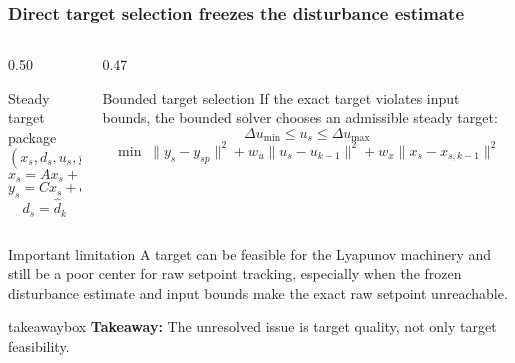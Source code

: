 \documentclass[aspectratio=169]{beamer}
\newcommand{\takeawaybox}[1]{%
\vspace{0.03cm}
\begin{center}
\begin{beamercolorbox}[wd=0.94\textwidth,sep=3pt,center,rounded=true,shadow=false]{takeawaybox}
\scriptsize
\textbf{\textcolor{maroon1}{Takeaway:}} #1
\end{beamercolorbox}
\end{center}
}
\begin{document}
\begin{frame}
\frametitle{\large \textbf{Direct target selection freezes the disturbance estimate}}
\scriptsize

\begin{columns}[T,onlytextwidth]
\begin{column}{0.50\textwidth}
\begin{block}{Steady target package}
\[
(x_s,d_s,u_s,y_s)
\]
\[
x_s=A x_s+B u_s
\]
\[
y_s=Cx_s+d_s
\]
\[
d_s=\hat d_k
\]
\end{block}
\end{column}

\begin{column}{0.47\textwidth}
\begin{block}{Bounded target selection}
If the exact target violates input bounds, the bounded solver chooses an admissible steady target:
\[
\Delta u_{\min}\le u_s\le \Delta u_{\max}
\]
\[
\min \; \|y_s-y_{sp}\|^2
+ w_u\|u_s-u_{k-1}\|^2
+ w_x\|x_s-x_{s,k-1}\|^2
\]
\end{block}
\end{column}
\end{columns}

\begin{block}{Important limitation}
\justifying
A target can be feasible for the Lyapunov machinery and still be a poor center for raw setpoint tracking, especially when the frozen disturbance estimate and input bounds make the exact raw setpoint unreachable.
\end{block}

\takeawaybox{The unresolved issue is target quality, not only target feasibility.}
\end{frame}
\end{document}
